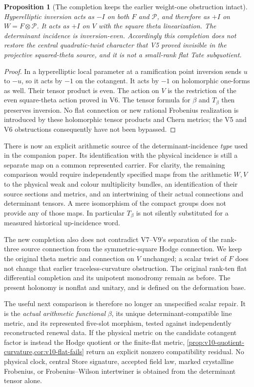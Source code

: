 \documentclass[11pt]{article}
\newtheorem{proposition}[proposition]{Proposition}
\theoremstyle{definition}
\theoremstyle{remark}
\begin{document}
\begin{proposition}[The completion keeps the earlier weight-one obstruction intact]
\label{prop:v10-parity}
Hyperelliptic inversion acts as $-I$ on both $F$ and $\mathscr P$, and
therefore as $+I$ on $W=F\otimes\mathscr P$. It acts as $+I$ on
$V$ with the square theta linearization. The determinant incidence is
inversion-even. Accordingly this completion does not restore the central
quadratic-twist character that V5 proved invisible in the projective
squared-theta source, and it is not a small-rank flat Tate subquotient.
\end{proposition}
\begin{proof}
In a hyperelliptic local parameter at a ramification point inversion
sends $u$ to $-u$, so it acts by $-1$ on the cotangent. It acts by
$-1$ on holomorphic one-forms as well. Their tensor product is even.
The action on $V$ is the restriction of the even square-theta action
proved in V6. The tensor formula for $\beta$ and $T_\beta$ then
preserves inversion. No flat connection or new rational Frobenius
realization is introduced by these holomorphic tensor products and Chern
metrics; the V5 and V6 obstructions consequently have not been bypassed.
\end{proof}

There is now an explicit arithmetic source of the determinant-incidence
\emph{type} used in the companion paper. Its identification with the
physical incidence is still a separate map on a common represented
carrier. For clarity, the remaining comparison would require independently
specified maps from the arithmetic $W,V$ to the physical weak and colour
multiplicity bundles, an identification of their source sections and
metrics, and an intertwining of their actual connections and determinant
tensors. A mere isomorphism of the compact groups does not provide any of
those maps. In particular $T_\beta$ is not silently substituted for a
measured historical up-incidence word.

The new completion also does not contradict V7--V9's separation of the
rank-three source connection from the symmetric-square Hodge connection.
We keep the original theta metric and connection on $V$ unchanged; a
scalar twist of $F$ does not change that earlier traceless-curvature
obstruction. The original rank-ten flat differential completion and its
unipotent monodromy remain as before. The present holonomy is nonflat and
unitary, and is defined on the deformation base.

The useful next comparison is therefore no longer an unspecified scalar
repair. It is the \emph{actual arithmetic functional} $\beta$, its
unique determinant-compatible line metric, and its represented five-slot
morphism, tested against independently reconstructed renewal data.
If the physical metric on the candidate cotangent factor is instead the
Hodge quotient or the finite-flat metric, \cref{prop:v10-quotient-curvature,cor:v10-flat-fails}
return an explicit nonzero compatibility residual. No physical clock,
central Store signature, accepted field law, marked crystalline Frobenius,
or Frobenius--Wilson intertwiner is obtained from the determinant tensor
alone.
\end{document}
